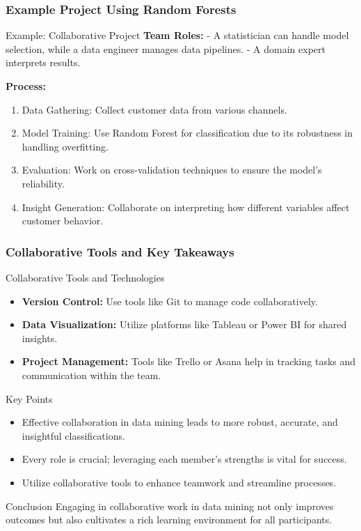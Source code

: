 \documentclass[aspectratio=169]{beamer}
\begin{document}
\begin{frame}[fragile]
    \frametitle{Example Project Using Random Forests}
    \begin{block}{Example: Collaborative Project}
        \textbf{Team Roles:} 
        - A statistician can handle model selection, while a data engineer manages data pipelines. 
        - A domain expert interprets results.
        
        \textbf{Process:}
        \begin{enumerate}
            \item Data Gathering: Collect customer data from various channels.
            \item Model Training: Use Random Forest for classification due to its robustness in handling overfitting.
            \item Evaluation: Work on cross-validation techniques to ensure the model's reliability.
            \item Insight Generation: Collaborate on interpreting how different variables affect customer behavior.
        \end{enumerate}
    \end{block}
\end{frame}

\begin{frame}[fragile]
    \frametitle{Collaborative Tools and Key Takeaways}
    \begin{block}{Collaborative Tools and Technologies}
        \begin{itemize}
            \item \textbf{Version Control:} Use tools like Git to manage code collaboratively.
            \item \textbf{Data Visualization:} Utilize platforms like Tableau or Power BI for shared insights.
            \item \textbf{Project Management:} Tools like Trello or Asana help in tracking tasks and communication within the team.
        \end{itemize}
    \end{block}

    \begin{block}{Key Points}
        \begin{itemize}
            \item Effective collaboration in data mining leads to more robust, accurate, and insightful classifications.
            \item Every role is crucial; leveraging each member's strengths is vital for success.
            \item Utilize collaborative tools to enhance teamwork and streamline processes.
        \end{itemize}
    \end{block}

    \begin{block}{Conclusion}
        Engaging in collaborative work in data mining not only improves outcomes but also cultivates a rich learning environment for all participants.
    \end{block}
\end{frame}
\end{document}
